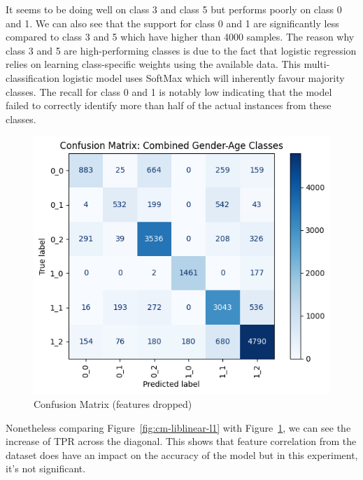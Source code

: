 \documentclass[10pt,twocolumn]{article}
\begin{document}
It seems to be doing well on class 3 and class 5 but performs poorly on class 0 and 1. We can also see that the support for class 0 and 1 are significantly less compared to class 3 and 5 which have higher than 4000 samples. The reason why class 3 and 5 are high-performing classes is due to the fact that logistic regression relies on learning class-specific weights using the available data. This multi-classification logistic model uses SoftMax which will inherently favour majority classes. The recall for class 0 and 1 is notably low indicating that the model failed to correctly identify more than half of the actual instances from these classes.
\begin{figure}[H]
    \centering
    \includegraphics[width=1\linewidth]{images/lr/cm-liblinear-l1-normal-training.png}
    \caption{Confusion Matrix (features dropped)}
    \label{fig:cm-reduced-data}
\end{figure}
Nonetheless comparing Figure~\ref{fig:cm-liblinear-l1} with Figure~\ref{fig:cm-reduced-data}, we can see the increase of TPR across the diagonal. This shows that feature correlation from the dataset does have an impact on the accuracy of the model but in this experiment, it's not significant.
\end{document}
